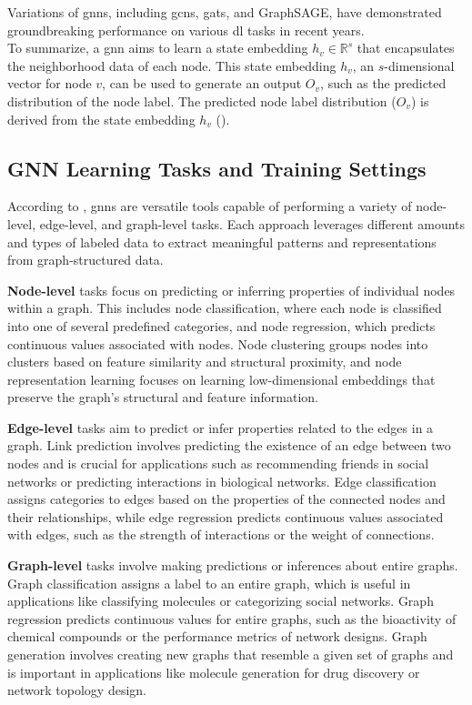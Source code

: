 Variations of \glspl{gnn}, including \glspl{gcn}, \glspl{gat}, and GraphSAGE, have demonstrated groundbreaking performance on various \gls{dl} tasks in recent years.
\\To summarize, a \gls{gnn} aims to learn a state embedding \( h_v \in \mathbb{R}^s \) that encapsulates the neighborhood data of each node.
This state embedding \( h_v \), an $s$-dimensional vector for node \( v \), can be used to generate an output \( O_v \), such as the predicted distribution of the node label.
The predicted node label distribution (\( O_v \)) is derived from the state embedding \( h_v \) (\cite{Rong2019}).

\subsection*{GNN Learning Tasks and Training Settings}
According to \cite{Zhou2020,Wu2021}, \glspl{gnn} are versatile tools capable of performing a variety of node-level, edge-level, and graph-level tasks.
Each approach leverages different amounts and types of labeled data to extract meaningful patterns and representations from graph-structured data.

\textbf{Node-level} tasks focus on predicting or inferring properties of individual nodes within a graph. This includes node classification, where each node is classified into one of several predefined categories, and node regression, which predicts continuous values associated with nodes.
Node clustering groups nodes into clusters based on feature similarity and structural proximity, and node representation learning focuses on learning low-dimensional embeddings that preserve the graph's structural and feature information.

\textbf{Edge-level} tasks aim to predict or infer properties related to the edges in a graph.
Link prediction involves predicting the existence of an edge between two nodes and is crucial for applications such as recommending friends in social networks or predicting interactions in biological networks.
Edge classification assigns categories to edges based on the properties of the connected nodes and their relationships, while edge regression predicts continuous values associated with edges, such as the strength of interactions or the weight of connections.

\textbf{Graph-level} tasks involve making predictions or inferences about entire graphs.
Graph classification assigns a label to an entire graph, which is useful in applications like classifying molecules or categorizing social networks.
Graph regression predicts continuous values for entire graphs, such as the bioactivity of chemical compounds or the performance metrics of network designs.
Graph generation involves creating new graphs that resemble a given set of graphs and is important in applications like molecule generation for drug discovery or network topology design.

